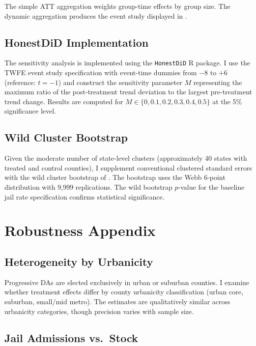\documentclass[12pt]{article}
\begin{document}
The simple ATT aggregation weights group-time effects by group size. The dynamic aggregation produces the event study displayed in .

\subsection{HonestDiD Implementation}

The \citet{rambachan2023honest} sensitivity analysis is implemented using the \texttt{HonestDiD} R package. I use the TWFE event study specification with event-time dummies from $-8$ to $+6$ (reference: $t = -1$) and construct the sensitivity parameter $M$ representing the maximum ratio of the post-treatment trend deviation to the largest pre-treatment trend change. Results are computed for $M \in \{0, 0.1, 0.2, 0.3, 0.4, 0.5\}$ at the 5\% significance level.

\subsection{Wild Cluster Bootstrap}

Given the moderate number of state-level clusters (approximately 40 states with treated and control counties), I supplement conventional clustered standard errors with the wild cluster bootstrap of \citet{rambachan2023honest}. The bootstrap uses the Webb 6-point distribution with 9,999 replications. The wild bootstrap $p$-value for the baseline jail rate specification confirms statistical significance.

\section{Robustness Appendix}

\subsection{Heterogeneity by Urbanicity}

Progressive DAs are elected exclusively in urban or suburban counties. I examine whether treatment effects differ by county urbanicity classification (urban core, suburban, small/mid metro). The estimates are qualitatively similar across urbanicity categories, though precision varies with sample size.

\subsection{Jail Admissions vs.\ Stock}
\end{document}
